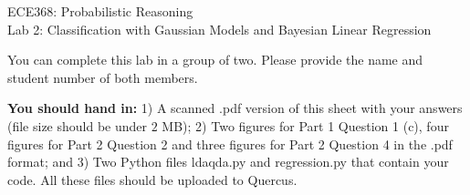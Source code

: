 \documentclass[twoside]{article}
\begin{document}
\begin{center}
\begin{spacing}{1.75}
{\Large { ECE368: Probabilistic Reasoning} \\
	{Lab 2: Classification with Gaussian Models and Bayesian Linear Regression}}
\end{spacing}
\vspace{-1em}
\end{center}
You can complete this lab in a group of two. Please provide the name and student number of both members.
\begin{center}
   \end{center}
   
{\bf You should hand in:} 1) A scanned \textsf{.pdf} version of this sheet with your answers (file size
should be under $2$ MB); 2) Two figures for Part 1 Question 1 (c), four figures for Part 2 Question 2 and three figures for Part 2 Question 4
in the \textsf{.pdf} format; and 3) Two Python files \textsf{ldaqda.py} and \textsf{regression.py} that
contain your code. All these files should be uploaded to Quercus.
\end{document}
